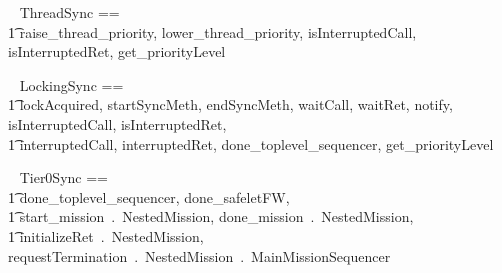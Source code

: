%

\begin{circus}
\circchannelset ~ ThreadSync == \\ \t1  \lchanset raise\_thread\_priority, lower\_thread\_priority, isInterruptedCall, isInterruptedRet, get\_priorityLevel \rchanset
\end{circus}

\begin{circus}
\circchannelset ~ LockingSync == \\ \t1  \lchanset lockAcquired, startSyncMeth, endSyncMeth, waitCall, waitRet, notify, isInterruptedCall, isInterruptedRet, \\
\t1 interruptedCall, interruptedRet, done\_toplevel\_sequencer, get\_priorityLevel  \rchanset
\end{circus}

\begin{circus}
\circchannelset ~ Tier0Sync == \\
\t1 \lchanset
done\_toplevel\_sequencer, done\_safeletFW, \\
\t1 start\_mission~.~NestedMission, done\_mission~.~NestedMission,\\
\t1 initializeRet~.~NestedMission,
requestTermination~.~NestedMission~.~MainMissionSequencer


\rchanset
\end{circus}
%
%
